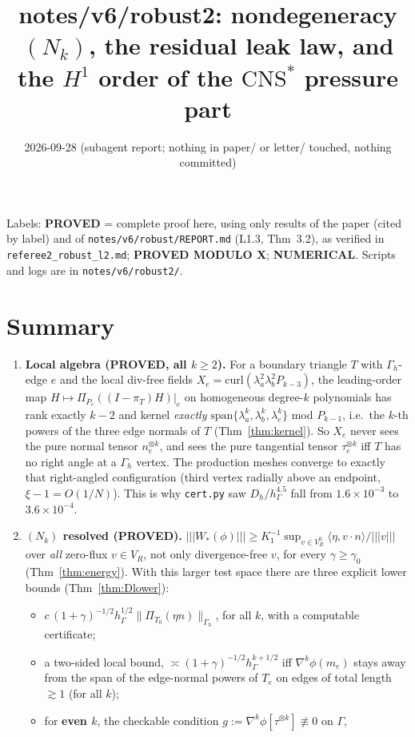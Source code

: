 \documentclass[11pt]{article}
\title{notes/v6/robust2: nondegeneracy $(N_k)$, the residual leak law, and the $H^1$ order of the $\mathrm{CNS}^\ast$ pressure part}
\date{2026-09-28 (subagent report; nothing in paper/ or letter/ touched, nothing committed)}
\theoremstyle{remark}
\newcommand{\tn}[1]{|\!|\!|#1|\!|\!|}
\newcommand{\hG}{h_\Gamma}
\newcommand{\Gh}{\Gamma_h}
\newcommand{\ip}[2]{\langle #1,#2\rangle}
\begin{document}
\maketitle

\noindent Labels: \textbf{PROVED} = complete proof here, using only results of the paper (cited by label) and of
\texttt{notes/v6/robust/REPORT.md} (L1.3, Thm~3.2), as verified in \texttt{referee2\_robust\_l2.md};
\textbf{PROVED MODULO X}; \textbf{NUMERICAL}. Scripts and logs are in \texttt{notes/v6/robust2/}.

\section*{Summary}
\begin{enumerate}
\item \textbf{Local algebra (PROVED, all $k\ge 2$).} For a boundary triangle $T$ with $\Gamma_h$-edge $e$ and the local
div-free fields $X_e=\mathrm{curl}(\lambda_a^2\lambda_b^2P_{k-3})$, the leading-order map
$H\mapsto \Pi_{P_e}((I-\pi_T)H)|_e$ on homogeneous degree-$k$ polynomials has rank exactly $k-2$ and kernel
\emph{exactly} $\mathrm{span}\{\lambda_a^k,\lambda_b^k,\lambda_c^k\}$ mod $P_{k-1}$, i.e.\ the $k$-th powers of the three
edge normals of $T$ (Thm~\ref{thm:kernel}). So $X_e$ never sees the pure normal tensor $n_e^{\otimes k}$, and sees the pure
tangential tensor $\tau_e^{\otimes k}$ iff $T$ has no right angle at a $\Gamma_h$ vertex. The production meshes converge to
exactly that right-angled configuration (third vertex radially above an endpoint, $\xi-1=O(1/N)$). This is why
\texttt{cert.py} saw $D_h/\hG^{4.5}$ fall from $1.6\times10^{-3}$ to $3.6\times10^{-4}$.
\item \textbf{$(N_k)$ resolved (PROVED).} $\tn{W_\ast(\phi)}\ge K_1^{-1}\sup_{v\in V_R^0}\ip{\eta}{v\cdot n}/\tn v$ over
\emph{all} zero-flux $v\in V_R$, not only divergence-free $v$, for every $\gamma\ge\gamma_0$ (Thm~\ref{thm:energy}).
With this larger test space there are three explicit lower bounds (Thm~\ref{thm:Dlower}):
 \begin{itemize}
 \item[(i)] $c\,(1+\gamma)^{-1/2}\hG^{1/2}\|\Pi_{T_0}(\eta n)\|_{\Gh}$, for all $k$, with a computable certificate;
 \item[(ii)] a two-sided local bound, $\asymp(1+\gamma)^{-1/2}\hG^{k+1/2}$ iff $\nabla^k\phi(m_e)$ stays away from the span of
 the edge-normal powers of $T_e$ on edges of total length $\gtrsim1$ (for all $k$);
 \item[(iii)] for \textbf{even $k$}, the checkable condition $g:=\nabla^k\phi[\tau^{\otimes k}]\not\equiv0$ on $\Gamma$,

\end{itemize}
\end{enumerate}
\end{document}

